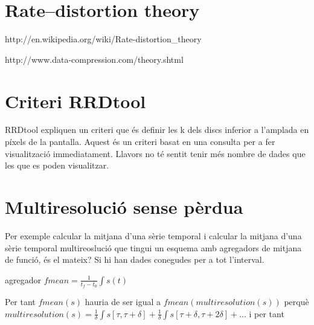 





\section{Rate–distortion theory}

http://en.wikipedia.org/wiki/Rate-distortion_theory

http://www.data-compression.com/theory.shtml






\section{Criteri RRDtool}

RRDtool expliquen un criteri que és definir les k dels discs inferior a l'amplada en píxels de la pantalla. Aquest és un criteri basat en una consulta per a fer visualització immediatament. Llavors no té sentit tenir més nombre de dades que les que es poden visualitzar. 



\section{Multiresolució sense pèrdua}


Per exemple calcular la mitjana d'una sèrie temporal i calcular la mitjana d'una sèrie temporal multireoslució que tingui un esquema amb agregadors de mitjana de funció, és el mateix? Si hi han dades conegudes per a tot l'interval.

agregador $fmean = \frac{1}{t_f-t_0}\int s(t)$

Per tant $fmean(s)$ hauria de ser igual a $fmean(multiresolution(s))$ perquè $multiresolution(s)= \frac{1}{\delta}\int s[\tau,\tau+\delta]+\frac{1}{\delta}\int s[\tau+\delta,\tau+2\delta]+\dots$ i per tant 

